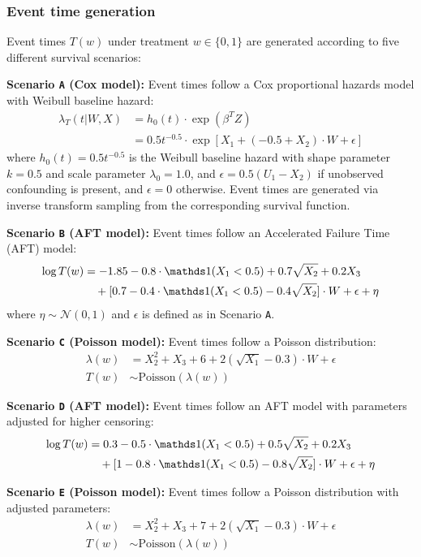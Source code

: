 \subsubsection{Event time generation}
Event times $T(w)$ under treatment $w\in\{0,1\}$ are generated according to five different survival scenarios:

\textbf{Scenario \texttt{A} (Cox model):} Event times follow a Cox proportional hazards model with Weibull baseline hazard:
\begin{align*}
\lambda_T(t | W, X) &= h_0(t) \cdot \exp(\beta^T Z) \\
&= 0.5t^{-0.5} \cdot \exp[X_{1} + (-0.5 + X_{2}) \cdot W + \epsilon]
\end{align*}
where $h_0(t) = 0.5t^{-0.5}$ is the Weibull baseline hazard with shape parameter $k=0.5$ and scale parameter $\lambda_0=1.0$, and $\epsilon = 0.5(U_{1} - X_{2})$ if unobserved confounding is present, and $\epsilon = 0$ otherwise.
Event times are generated via inverse transform sampling from the corresponding survival function.

\textbf{Scenario \texttt{B} (AFT model):} Event times follow an Accelerated Failure Time (AFT) model:
\begin{align*}
\log T(w) &= -1.85 - 0.8 \cdot \ChFourInd(X_{1} < 0.5) + 0.7\sqrt{X_{2}} + 0.2X_{3} \\
&\quad + [0.7 - 0.4 \cdot \ChFourInd(X_{1} < 0.5) - 0.4\sqrt{X_{2}}] \cdot W + \epsilon + \eta
\end{align*}
where $\eta \sim \mathcal{N}(0,1)$ and $\epsilon$ is defined as in Scenario \texttt{A}.

\textbf{Scenario \texttt{C} (Poisson model):} Event times follow a Poisson distribution:
\begin{align*}
\lambda(w) &= X_{2}^2 + X_{3} + 6 + 2(\sqrt{X_{1}} - 0.3) \cdot W + \epsilon \\
T(w) &\sim \text{Poisson}(\lambda(w))
\end{align*}

\textbf{Scenario \texttt{D} (AFT model):} Event times follow an AFT model with parameters adjusted for higher censoring:
\begin{align*}
\log T(w) &= 0.3 - 0.5 \cdot \ChFourInd(X_{1} < 0.5) + 0.5\sqrt{X_{2}} + 0.2X_{3} \\
&\quad + [1 - 0.8 \cdot \ChFourInd(X_{1} < 0.5) - 0.8\sqrt{X_{2}}] \cdot W + \epsilon + \eta
\end{align*}

\textbf{Scenario \texttt{E} (Poisson model):} Event times follow a Poisson distribution with adjusted parameters:
\begin{align*}
\lambda(w) &= X_{2}^2 + X_{3} + 7 + 2(\sqrt{X_{1}} - 0.3) \cdot W + \epsilon \\
T(w) &\sim \text{Poisson}(\lambda(w))
\end{align*}

